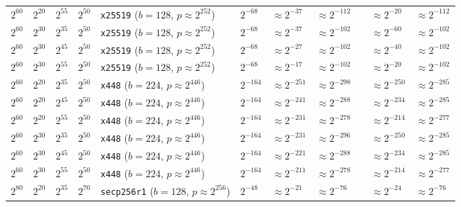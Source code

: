 \begin{table}[p]
\begin{tabular}{@{}lllllllllll@{}}
$2^{60}$	&$2^{20}$	&$2^{55}$	&$2^{50}$	&\texttt{x25519} ($b \!=\! 128$,\! $p \!\approx\! 2^{252}$)	&$2^{-68}$	&\cellcolor{red!25}$\approx 2^{-37}$	&$\approx 2^{-112}$	&& \cellcolor{red!25}$\approx 2^{-20}$	&$\approx 2^{-112}$	 \\
$2^{60}$	&$2^{30}$	&$2^{35}$	&$2^{50}$	&\texttt{x25519} ($b \!=\! 128$,\! $p \!\approx\! 2^{252}$)	&$2^{-68}$	&\cellcolor{red!25}$\approx 2^{-37}$	&$\approx 2^{-102}$	&& \cellcolor{red!25}$\approx 2^{-60}$	&$\approx 2^{-102}$	 \\
$2^{60}$	&$2^{30}$	&$2^{45}$	&$2^{50}$	&\texttt{x25519} ($b \!=\! 128$,\! $p \!\approx\! 2^{252}$)	&$2^{-68}$	&\cellcolor{red!25}$\approx 2^{-27}$	&$\approx 2^{-102}$	&& \cellcolor{red!25}$\approx 2^{-40}$	&$\approx 2^{-102}$	 \\
$2^{60}$	&$2^{30}$	&$2^{55}$	&$2^{50}$	&\texttt{x25519} ($b \!=\! 128$,\! $p \!\approx\! 2^{252}$)	&$2^{-68}$	&\cellcolor{red!25}$\approx 2^{-17}$	&$\approx 2^{-102}$	&& \cellcolor{red!25}$\approx 2^{-20}$	&$\approx 2^{-102}$	 \\
\midrule
$2^{60}$	&$2^{20}$	&$2^{35}$	&$2^{50}$	&\texttt{x448} ($b \!=\! 224$,\! $p \!\approx\! 2^{446}$)	&$2^{-164}$	&$\approx 2^{-251}$	& $\approx 2^{-298}$	&& $\approx 2^{-250}$	& $\approx 2^{-285}$	 \\
$2^{60}$	&$2^{20}$	&$2^{45}$	&$2^{50}$	&\texttt{x448} ($b \!=\! 224$,\! $p \!\approx\! 2^{446}$)	&$2^{-164}$	&$\approx 2^{-241}$	& $\approx 2^{-288}$	&& $\approx 2^{-234}$	& $\approx 2^{-285}$	 \\
$2^{60}$	&$2^{20}$	&$2^{55}$	&$2^{50}$	&\texttt{x448} ($b \!=\! 224$,\! $p \!\approx\! 2^{446}$)	&$2^{-164}$	&$\approx 2^{-231}$	& $\approx 2^{-278}$	&& $\approx 2^{-214}$	& $\approx 2^{-277}$	 \\
$2^{60}$	&$2^{30}$	&$2^{35}$	&$2^{50}$	&\texttt{x448} ($b \!=\! 224$,\! $p \!\approx\! 2^{446}$)	&$2^{-164}$	&$\approx 2^{-231}$	& $\approx 2^{-296}$	&& $\approx 2^{-250}$	& $\approx 2^{-285}$	 \\
$2^{60}$	&$2^{30}$	&$2^{45}$	&$2^{50}$	&\texttt{x448} ($b \!=\! 224$,\! $p \!\approx\! 2^{446}$)	&$2^{-164}$	&$\approx 2^{-221}$	& $\approx 2^{-288}$	&& $\approx 2^{-234}$	& $\approx 2^{-285}$	 \\
$2^{60}$	&$2^{30}$	&$2^{55}$	&$2^{50}$	&\texttt{x448} ($b \!=\! 224$,\! $p \!\approx\! 2^{446}$)	&$2^{-164}$	&$\approx 2^{-211}$	& $\approx 2^{-278}$	&& $\approx 2^{-214}$	& $\approx 2^{-277}$	 \\
\midrule
\midrule
$2^{80}$	&$2^{20}$	&$2^{35}$	&$2^{70}$	&\texttt{secp256r1} ($b \!=\! 128$,\! $p \!\approx\! 2^{256}$)	&$2^{-48}$	&\cellcolor{red!25}$\approx 2^{-21}$	&$\approx 2^{-76}$	&& \cellcolor{red!25}$\approx 2^{-24}$	&$\approx 2^{-76}$	 \\

\end{tabular}
\end{table}
